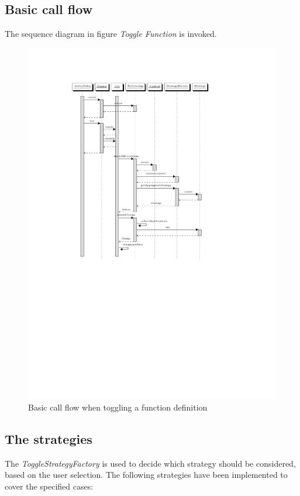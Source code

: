 \subsection{Basic call flow}
The sequence diagram in figure %
\textit{Toggle Function} is invoked.
\begin{figure}[h]
  \centering
  \includegraphics[trim = 35mm 120mm 40mm 28mm,clip,scale=0.8]{seqdiagram/seqdiagram.pdf} %
  \caption{Basic call flow when toggling a function definition}
  \label{sd}
\end{figure}

\subsection{The strategies}
The \textit{ToggleStrategyFactory} is used to decide which strategy should be 
considered, based on the user selection. The following strategies have been
implemented to cover the specified cases:

